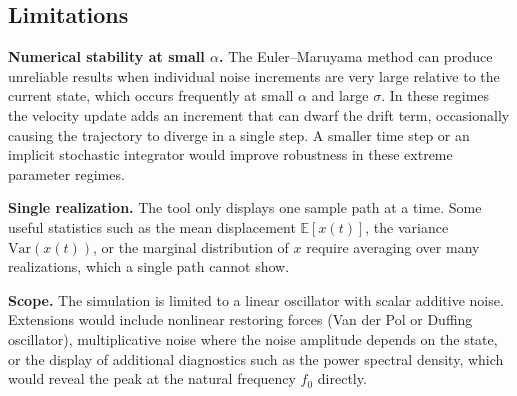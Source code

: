 \documentclass[12pt]{article}
\begin{document}
\subsection{Limitations}

\textbf{Numerical stability at small $\alpha$.} The Euler--Maruyama method
can produce unreliable results when individual noise increments are very large
relative to the current state, which occurs frequently at small $\alpha$ and
large $\sigma$. In these regimes the velocity update adds an increment that
can dwarf the drift term, occasionally causing the trajectory to diverge in
a single step. A smaller time step or an implicit stochastic integrator
would improve robustness in these extreme parameter regimes.

\textbf{Single realization.} The tool only displays one sample path at a time.
Some useful statistics such as the mean displacement
$\mathbb{E}[x(t)]$, the variance $\mathrm{Var}(x(t))$, or the marginal
distribution of $x$ require averaging over many realizations, which a single path cannot show.

\textbf{Scope.} The simulation is limited to a linear oscillator with scalar
additive noise. Extensions would include nonlinear restoring forces
(Van der Pol or Duffing oscillator), multiplicative noise where the noise
amplitude depends on the state, or the display of additional diagnostics
such as the power spectral density, which would reveal the peak at the
natural frequency $f_0$ directly.
\end{document}
